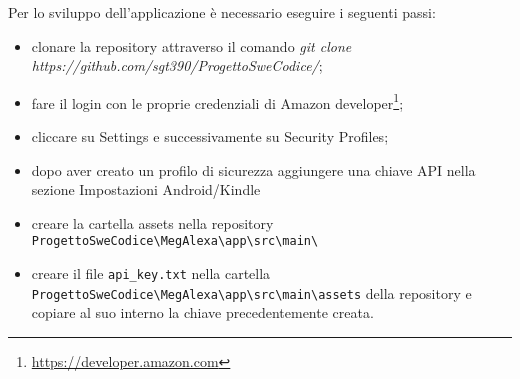 Per lo sviluppo dell'applicazione è necessario eseguire i seguenti passi:
\begin{itemize}
	\item clonare la repository attraverso il comando \textit{git clone\\https://github.com/sgt390/ProgettoSweCodice/};
	\item fare il login con le proprie credenziali di Amazon developer\footnote{\url{ https://developer.amazon.com}};
	\item cliccare su Settings e successivamente su Security Profiles;
	\item dopo aver creato un profilo di sicurezza aggiungere una chiave API nella sezione Impostazioni Android/Kindle
	\item creare la cartella assets nella repository \texttt{ProgettoSweCodice\textbackslash MegAlexa\textbackslash app\textbackslash  src\textbackslash main\textbackslash}
	\item creare il file \texttt{api\_key.txt} nella cartella \texttt{ProgettoSweCodice\textbackslash MegAlexa\textbackslash app\textbackslash  src\textbackslash main\textbackslash assets} della repository e copiare al suo interno la chiave precedentemente creata.
	
\end{itemize}
